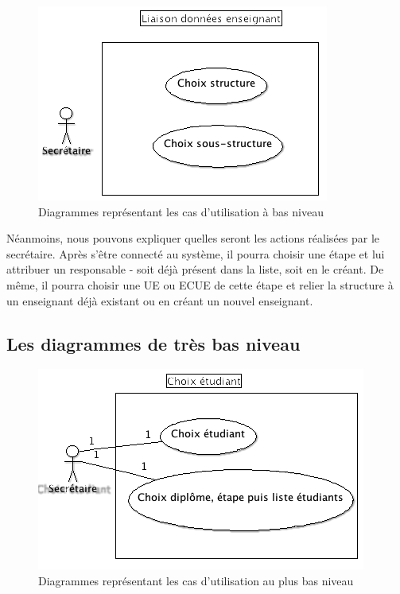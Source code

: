 \documentclass[letter, 11pt] {article}
\begin{document}
\begin{figure}[!h]
\includegraphics[scale = 0.7]{../UseCase/UseCaseBasNiveau/LiaisonDonneesEnseignant.png}
\caption{Diagrammes représentant les cas d'utilisation à bas niveau}
\end{figure}

Néanmoins, nous pouvons expliquer quelles seront les actions réalisées par le secrétaire.
Après s'être connecté au système, il pourra choisir une étape et lui attribuer un responsable
- soit déjà présent dans la liste, soit en le créant. De même, il pourra choisir une UE ou ECUE de cette étape et
relier la structure à un enseignant déjà existant ou en créant un nouvel enseignant.



	\subsection{Les diagrammes de très bas niveau}

			\begin{figure}[!h]
\includegraphics[scale = 0.7]{../UseCase/UseCaseTresBasNiveau/ChoixEtudiant.png}
				\caption{Diagrammes représentant les cas d'utilisation au plus bas niveau}
\end{figure}
\end{document}
